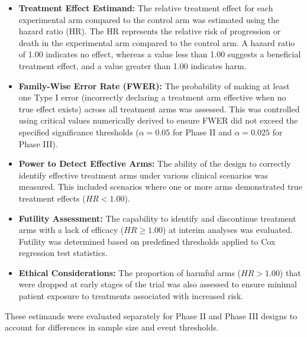 \documentclass[11pt, a4paper]{article}\usepackage[]{graphicx}\usepackage[]{xcolor}
\begin{document}
\begin{itemize}
    \item \textbf{Treatment Effect Estimand:} The relative treatment effect for each experimental arm compared to the control arm was estimated using the hazard ratio (HR). The HR represents the relative risk of progression or death in the experimental arm compared to the control arm. A hazard ratio of 1.00 indicates no effect, whereas a value less than 1.00 suggests a beneficial treatment effect, and a value greater than 1.00 indicates harm.
    \item \textbf{Family-Wise Error Rate (FWER):} The probability of making at least one Type I error (incorrectly declaring a treatment arm effective when no true effect exists) across all treatment arms was assessed. This was controlled using critical values numerically derived to ensure FWER did not exceed the specified significance thresholds (\(\alpha = 0.05\) for Phase II and \(\alpha = 0.025\) for Phase III).
    \item \textbf{Power to Detect Effective Arms:} The ability of the design to correctly identify effective treatment arms under various clinical scenarios was measured. This included scenarios where one or more arms demonstrated true treatment effects (\(HR < 1.00\)).
    \item \textbf{Futility Assessment:} The capability to identify and discontinue treatment arms with a lack of efficacy (\(HR \geq 1.00\)) at interim analyses was evaluated. Futility was determined based on predefined thresholds applied to Cox regression test statistics.
    \item \textbf{Ethical Considerations:} The proportion of harmful arms (\(HR > 1.00\)) that were dropped at early stages of the trial was also assessed to ensure minimal patient exposure to treatments associated with increased risk.
\end{itemize}

These estimands were evaluated separately for Phase II and Phase III designs to account for differences in sample size and event thresholds.
\end{document}
